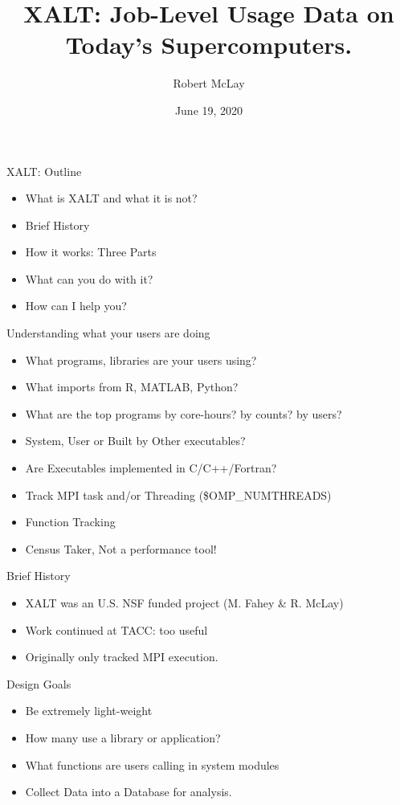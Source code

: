 \documentclass{beamer}
\begin{document}
\title[XALT]{XALT: Job-Level Usage Data on Today's Supercomputers.}
\author{Robert McLay} 
\date{June 19, 2020} 

\frame{\titlepage} 

\begin{frame}{XALT: Outline}
  \begin{itemize}
    \item What is XALT and what it is not?
    \item Brief History
    \item How it works: Three Parts
    \item What can you do with it?
    \item How can I help you?
  \end{itemize}
\end{frame}

\begin{frame}{Understanding what your users are doing}
  \begin{itemize}
    \item What programs, libraries are your users using?
    \item What imports from R, MATLAB, Python?
    \item What are the top programs by core-hours? by counts? by users?
    \item System, User or Built by Other executables?
    \item Are Executables implemented in C/C++/Fortran?
    \item Track MPI task and/or Threading (\$OMP\_NUMTHREADS)
    \item Function Tracking
    \item Census Taker, Not a performance tool!
  \end{itemize}
\end{frame}

\begin{frame}{Brief History}
  \begin{itemize}
    \item XALT was an U.S. NSF funded project (M. Fahey \& R. McLay)
    \item Work continued at TACC: too useful
    \item Originally only tracked MPI execution.
  \end{itemize}
\end{frame}

\begin{frame}{Design Goals}
  \begin{itemize}
    \item Be extremely light-weight
    \item How many use a library or application?
    \item What functions are users calling in system modules
    \item Collect Data into a Database for analysis.
  \end{itemize}
\end{frame}
\end{document}
